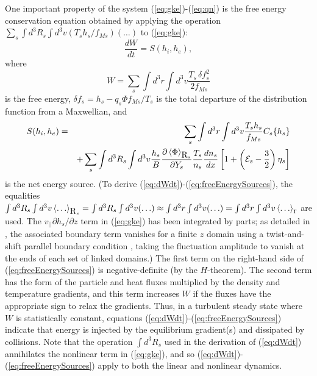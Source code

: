 \documentclass{jpp}
\begin{document}
One important property of the system (\ref{eq:gke})-(\ref{eq:qn})
is the free energy conservation equation \citep{Sugama1996, Howes, AbelReview}
obtained by applying the operation $\sum_s \int d^3R_s \int d^3v (T_s h_s/f_{Ms}) (\ldots)$ to (\ref{eq:gke}):
\begin{equation}
\frac{d W}{d t} = S(h_i,h_e),
\label{eq:dWdt}
\end{equation}
where
\begin{equation}
\label{eq:W}
W = \sum_s \int d^3r \int d^3v \frac{T_s \, \delta\! f_s^2}{2 f_{Ms}}
\end{equation}
is the free energy, $\delta\! f_s = h_s - q_s \Phi f_{Ms}/T_s$ is the total departure of the distribution
function from a Maxwellian,
and
\begin{eqnarray}
\label{eq:freeEnergySources}
S(h_i,h_e)
&=&
\sum_s \int d^3r \int d^3v \frac{T_s h_s}{f_{Ms}}  C_s\{ h_s \}  \\
&&+\sum_s
\int d^3R_s \int d^3v \frac{h_s}{B} \frac{\partial \left< \Phi\right>_{\boldsymbol{$R$}_s}}{\partial Y_s}
 \frac{T_s}{n_s}\frac{dn_s}{dx}
\left[ 1 + \left( \mathcal{E}_s-\frac{3}{2}\right) \eta_s\right]
\nonumber
\end{eqnarray}
is the net energy source.
(To derive (\ref{eq:dWdt})-(\ref{eq:freeEnergySources}), the equalities
$\int d^3 R_s \int d^3v \left< \ldots\right>_{\boldsymbol{$R$}_s}
= \int d^3 R_s \int d^3v (\ldots)
\approx \int d^3 r \int d^3v (\ldots)
= \int d^3 r \int d^3v \left< \ldots\right>_{\boldsymbol{$r$}}
$ are used.
The $v_{||} \partial h_s/\partial z$ term in (\ref{eq:gke}) has been integrated by parts;
as detailed in \citet[pp. 66]{BanonNavarroThesis}, the associated boundary term vanishes for a finite $z$ domain
using a twist-and-shift parallel boundary condition \citep{Beer1995},
taking the fluctuation amplitude to vanish at the ends of each set of linked domains.)
The first term on the right-hand side of (\ref{eq:freeEnergySources})
is negative-definite (by the $H$-theorem).
The second term has the form of the particle and heat fluxes multiplied by
the density and temperature gradients, and this term increases $W$ if the fluxes have the appropriate sign
to relax the gradients.
Thus, in a turbulent steady state where $W$ is statistically constant,
equations (\ref{eq:dWdt})-(\ref{eq:freeEnergySources}) indicate
that energy is injected by the equilibrium gradient(s)
and dissipated by collisions.
Note that the operation $\int d^3R_s$ used in the derivation of
(\ref{eq:dWdt}) annihilates the nonlinear term
in (\ref{eq:gke}), and so (\ref{eq:dWdt})-(\ref{eq:freeEnergySources})
apply to both the linear and nonlinear dynamics.
\end{document}
